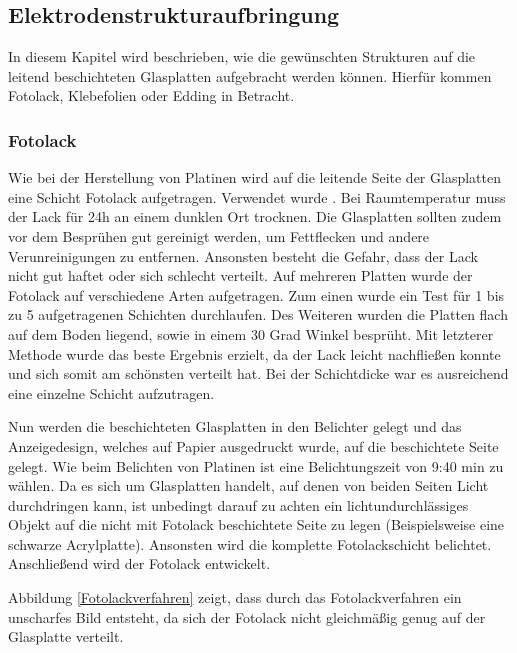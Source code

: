 \subsection{Elektrodenstrukturaufbringung}

In diesem Kapitel wird beschrieben, wie die gewünschten Strukturen auf die leitend beschichteten Glasplatten aufgebracht werden können. Hierfür kommen Fotolack, Klebefolien oder Edding in Betracht.%

\subsubsection*{Fotolack}

Wie bei der Herstellung von Platinen wird auf die leitende Seite der Glasplatten eine Schicht Fotolack aufgetragen. Verwendet wurde \cite[\textit{POSITIV 20 Lichtemfpindlicher Lack}]{Fotolack}.
Bei Raumtemperatur muss der Lack für 24h an einem dunklen Ort trocknen. Die Glasplatten sollten zudem vor dem Besprühen gut gereinigt werden, um Fettflecken und andere Verunreinigungen zu entfernen. Ansonsten besteht die Gefahr, dass der Lack nicht gut haftet oder sich schlecht verteilt.
Auf mehreren Platten wurde der Fotolack auf verschiedene Arten aufgetragen. Zum einen wurde ein Test für 1 bis zu 5 aufgetragenen Schichten durchlaufen. Des Weiteren wurden die Platten flach auf dem Boden liegend, sowie in einem 30 Grad Winkel besprüht.
Mit letzterer Methode wurde das beste Ergebnis erzielt, da der Lack leicht nachfließen konnte und sich somit am schönsten verteilt hat. Bei der Schichtdicke war es ausreichend eine einzelne Schicht aufzutragen.

Nun werden die beschichteten Glasplatten in den Belichter gelegt und das Anzeigedesign, welches auf Papier ausgedruckt wurde, auf die beschichtete Seite gelegt. Wie beim Belichten von Platinen ist eine Belichtungszeit von 9:40 min zu wählen. Da es sich um Glasplatten handelt, auf denen von beiden Seiten Licht durchdringen kann, ist unbedingt darauf zu achten ein lichtundurchlässiges Objekt auf die nicht mit Fotolack beschichtete Seite zu legen (Beispielsweise eine schwarze Acrylplatte). Ansonsten wird die komplette Fotolackschicht belichtet. Anschließend wird der Fotolack entwickelt. %

Abbildung \ref{Fotolackverfahren} zeigt, dass durch das Fotolackverfahren ein unscharfes Bild entsteht, da sich der Fotolack nicht gleichmäßig genug auf der Glasplatte verteilt.\\

